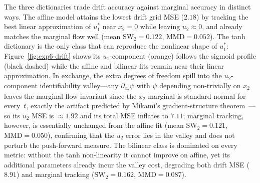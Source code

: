 \documentclass[11pt,leqno]{article}
\theoremstyle{plain}
\theoremstyle{remark}
\theoremstyle{definition}
\numberwithin{equation}{section}
\numberwithin{figure}{section}
\numberwithin{table}{section}
\begin{document}
The three dictionaries trade drift accuracy against marginal accuracy in
distinct ways.  The affine model attains the lowest drift grid MSE
($2.18$) by tracking the best linear approximation of $u_1^{\!*}$ near
$x_2=0$ while leaving $u_2\approx 0$, and already matches the marginal
flow well (mean $\mathrm{SW}_2=0.122$, $\mathrm{MMD}=0.052$).  The tanh
dictionary is the only class that can reproduce the nonlinear shape of
$u_1^{\!*}$: Figure~\ref{fig:exp6-drift} shows its $u_1$-component
(orange) follows the sigmoid profile (black dashed) while the
affine and bilinear fits remain near their linear approximation.  In
exchange, the extra degrees of freedom spill into the $u_2$-component
identifiability valley---any $\partial_{x_2}\psi$ with $\psi$
depending non-trivially on $x_2$ leaves the marginal flow invariant
since the $x_2$-marginal is standard normal for every~$t$, exactly
the artifact predicted by Mikami's gradient-structure
theorem~\cite[Theorem~3.8]{Mikami2021}---so its $u_2$ MSE is
$\approx 1.92$ and its total MSE inflates to $7.11$; marginal tracking,
however, is essentially unchanged from the affine fit
(mean $\mathrm{SW}_2=0.121$, $\mathrm{MMD}=0.050$), confirming that the
$u_2$ error lies in the valley and does not perturb the push-forward
measure.  The bilinear class is dominated on every metric: without the
tanh non-linearity it cannot improve on affine, yet its additional
parameters already incur the valley cost, degrading both drift MSE
($8.91$) and marginal tracking ($\mathrm{SW}_2=0.162$,
$\mathrm{MMD}=0.087$).
\end{document}
